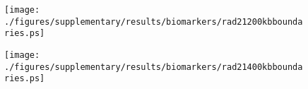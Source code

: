 \begin{figure}[H]
  \begin{minipage}{0.45\textwidth}%
    \texttt{[image: ./figures/supplementary/results/biomarkers/rad21200kbboundaries.ps]}
  \end{minipage}%
  \hfill
  \begin{minipage}{0.45\textwidth}
    \texttt{[image: ./figures/supplementary/results/biomarkers/rad21400kbboundaries.ps]}
  \end{minipage}
\end{figure}
